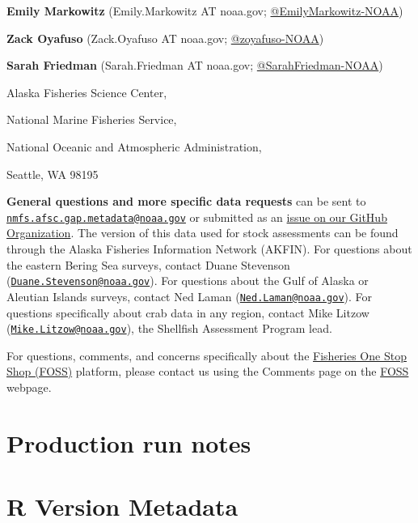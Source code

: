 \documentclass[
  letterpaper,
  oneside,
  open=any]{scrbook}
\begin{document}

\textbf{Emily Markowitz} (Emily.Markowitz AT noaa.gov;
\href{https://github.com/EmilyMarkowitz-NOAA}{@EmilyMarkowitz-NOAA})

\textbf{Zack Oyafuso} (Zack.Oyafuso AT noaa.gov;
\href{https://github.com/zoyafuso-NOAA}{@zoyafuso-NOAA})

\textbf{Sarah Friedman} (Sarah.Friedman AT noaa.gov;
\href{https://github.com/SarahFriedman-NOAA}{@SarahFriedman-NOAA})

Alaska Fisheries Science Center,

National Marine Fisheries Service,

National Oceanic and Atmospheric Administration,

Seattle, WA 98195

\textbf{General questions and more specific data requests} can be sent
to
\href{mailto:nmfs.afsc.gap.metadata@noaa.gov}{\nolinkurl{nmfs.afsc.gap.metadata@noaa.gov}}
or submitted as an
\href{https://github.com/afsc-gap-products/data-requests}{issue on our
GitHub Organization}. The version of this data used for stock
assessments can be found through the Alaska Fisheries Information
Network (AKFIN). For questions about the eastern Bering Sea surveys,
contact Duane Stevenson
(\href{mailto:Duane.Stevenson@noaa.gov}{\nolinkurl{Duane.Stevenson@noaa.gov}}).
For questions about the Gulf of Alaska or Aleutian Islands surveys,
contact Ned Laman
(\href{mailto:Ned.Laman@noaa.gov}{\nolinkurl{Ned.Laman@noaa.gov}}). For
questions specifically about crab data in any region, contact Mike
Litzow
(\href{mailto:Mike.Litzow@noaa.gov}{\nolinkurl{Mike.Litzow@noaa.gov}}),
the Shellfish Assessment Program lead.

For questions, comments, and concerns specifically about the
\href{https://www.fisheries.noaa.gov/foss}{Fisheries One Stop Shop
(FOSS)} platform, please contact us using the Comments page on the
\href{https://www.fisheries.noaa.gov/foss}{FOSS} webpage.

\hypertarget{production-run-notes}{%
\chapter{Production run notes}\label{production-run-notes}}

\hypertarget{r-version-metadata}{%
\chapter{R Version Metadata}\label{r-version-metadata}}
\end{document}
